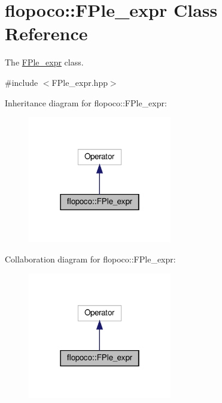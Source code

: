 \hypertarget{classflopoco_1_1FPle__expr}{}\section{flopoco\+:\+:F\+Ple\+\_\+expr Class Reference}
\label{classflopoco_1_1FPle__expr}


The \hyperlink{classflopoco_1_1FPle__expr}{F\+Ple\+\_\+expr} class.  




{\ttfamily \#include $<$F\+Ple\+\_\+expr.\+hpp$>$}



Inheritance diagram for flopoco\+:\+:F\+Ple\+\_\+expr\+:
\nopagebreak
\begin{figure}[H]
\begin{center}
\leavevmode
\includegraphics[width=178pt]{df/d6a/classflopoco_1_1FPle__expr__inherit__graph}
\end{center}
\end{figure}


Collaboration diagram for flopoco\+:\+:F\+Ple\+\_\+expr\+:
\nopagebreak
\begin{figure}[H]
\begin{center}
\leavevmode
\includegraphics[width=178pt]{d0/d6c/classflopoco_1_1FPle__expr__coll__graph}
\end{center}
\end{figure}
